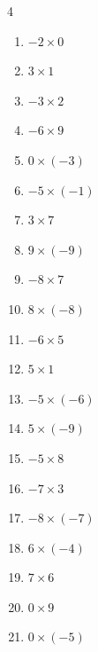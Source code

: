 \begin{multicols}{4}
\begin{enumerate}
  \item $-2\times 0$
        \phantom{$=0$}

  \item $3\times 1$
        \phantom{$=3$}

  \item $-3\times 2$
        \phantom{$=-6$}

  \item $-6\times 9$
        \phantom{$=-54$}

  \item $0\times (-3)$
        \phantom{$=0$}

  \item $-5\times (-1)$
        \phantom{$=5$}

  \item $3\times 7$
        \phantom{$=21$}

  \item $9\times (-9)$
        \phantom{$=-81$}

  \item $-8\times 7$
        \phantom{$=-56$}

  \item $8\times (-8)$
        \phantom{$=-64$}

  \item $-6\times 5$
        \phantom{$=-30$}

  \item $5\times 1$
        \phantom{$=5$}

  \item $-5\times (-6)$
        \phantom{$=30$}

  \item $5\times (-9)$
        \phantom{$=-45$}

  \item $-5\times 8$
        \phantom{$=-40$}

  \item $-7\times 3$
        \phantom{$=-21$}

  \item $-8\times (-7)$
        \phantom{$=56$}

  \item $6\times (-4)$
        \phantom{$=-24$}

  \item $7\times 6$
        \phantom{$=42$}

  \item $0\times 9$
        \phantom{$=0$}

  \item $0\times (-5)$
        \phantom{$=0$}


\end{enumerate}
\end{multicols}
